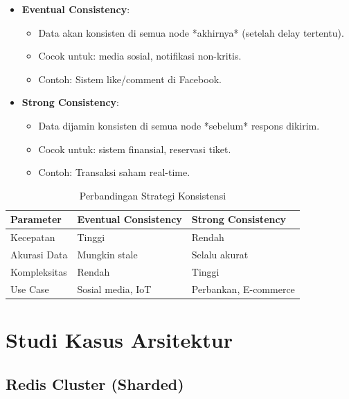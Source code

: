 \documentclass[11pt, a4paper]{book}
\begin{document}
	\begin{itemize}
		\item \textbf{Eventual Consistency}:
		\begin{itemize}
			\item Data akan konsisten di semua node *akhirnya* (setelah delay tertentu).
			\item Cocok untuk: media sosial, notifikasi non-kritis.
			\item Contoh: Sistem like/comment di Facebook.
		\end{itemize}
		
		\item \textbf{Strong Consistency}:
		\begin{itemize}
			\item Data dijamin konsisten di semua node *sebelum* respons dikirim.
			\item Cocok untuk: sistem finansial, reservasi tiket.
			\item Contoh: Transaksi saham real-time.
		\end{itemize}
	\end{itemize}
	
	\begin{table}[h]
		\centering
		\caption{Perbandingan Strategi Konsistensi}
		\label{tab:konsistensi}
		\begin{tabularx}{\textwidth}{|l|X|X|}
			\hline
			\textbf{Parameter} & \textbf{Eventual Consistency} & \textbf{Strong Consistency} \\ \hline
			Kecepatan & Tinggi & Rendah \\ \hline
			Akurasi Data & Mungkin stale & Selalu akurat \\ \hline
			Kompleksitas & Rendah & Tinggi \\ \hline
			Use Case & Sosial media, IoT & Perbankan, E-commerce \\ \hline
		\end{tabularx}
	\end{table}
	
	\section{Studi Kasus Arsitektur}
	\label{sec:studi-kasus}
	
	\subsection{Redis Cluster (Sharded)}
	\label{subsec:redis-cluster}
	
\end{document}
